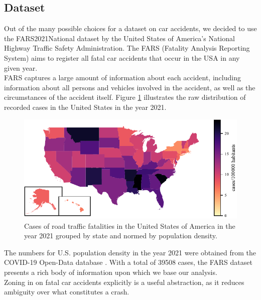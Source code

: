 \documentclass{article}
\theoremstyle{plain}
\theoremstyle{definition}
\theoremstyle{remark}
\begin{document}
\subsection{Dataset}
Out of the many possible choices for a dataset on car accidents, we decided to use the FARS2021National dataset by the United States of America's National Highway Traffic Safety Administration. The FARS (Fatality Analysis Reporting System) aims to register all fatal car accidents that occur in the USA in any given year.
\\
FARS captures a large amount of information about each accident, including information about all persons and vehicles involved in the accident, as well as the circumstances of the accident itself. Figure \ref{fig:cases-fars} illustrates the raw distribution of recorded cases in the United States in the year 2021.
\begin{figure}[ht]
	\vskip 0.2in
	\begin{center}
		\includegraphics[width = \columnwidth]{plots/cases-fars}
		\caption{Cases of road traffic fatalities in the United States of America in the year 2021 grouped by state and normed by population density.}
		\label{fig:cases-fars}
	\end{center}
	\vskip -0.2in
\end{figure}
The numbers for U.S. population density in the year 2021 were obtained from the COVID-19 Open-Data database \cite{google}. With a total of 39508 cases, the FARS dataset presents a rich body of information upon which we base our analysis.
\\
Zoning in on fatal car accidents explicitly is a useful abstraction, as it reduces ambiguity over what constitutes a crash.
\end{document}
